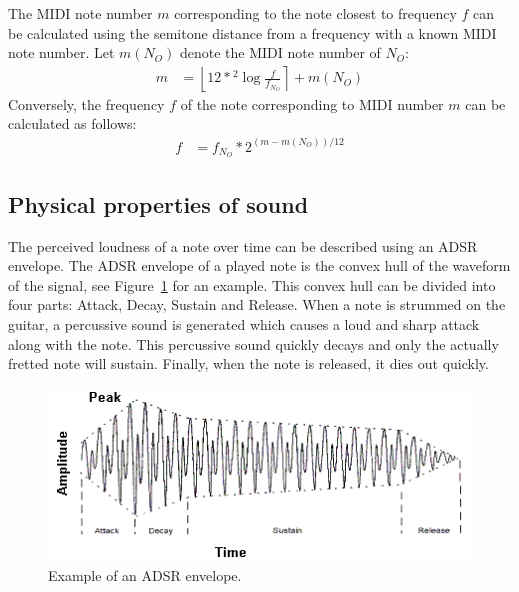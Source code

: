 \documentclass[a4paper,10pt,twocolumn]{article}
\newcommand{\round}[1]{\left \lfloor #1 \right \rceil}
\begin{document}
The MIDI note number $m$ corresponding to the note closest to frequency $f$ can be calculated using the semitone distance from a frequency with a known MIDI note number. Let $m(N_O)$ denote the MIDI note number of $N_O$:
\begin{align*}
    m &= \round{12 * {}^{2}\!\log{\frac{f}{f_{N_O}}}} + m(N_O)%
\end{align*}
Conversely, the frequency $f$ of the note corresponding to MIDI number $m$ can be calculated as follows:
\begin{align*}
    f &= f_{N_O} * 2^{(m - m(N_O)) / 12}%
\end{align*}


\subsection{Physical properties of sound}  \label{sec:physsound}
The perceived loudness of a note over time can be described using an ADSR envelope. The ADSR envelope of a played note is the convex hull of the waveform of the signal, see Figure~\ref{fig:adsr} for an example. This convex hull can be divided into four parts: Attack, Decay, Sustain and Release. When a note is strummed on the guitar, a percussive sound is generated which causes a loud and sharp attack along with the note. This percussive sound quickly decays and only the actually fretted note will sustain. Finally, when the note is released, it dies out quickly.
\begin{figure}[h]
    \centering
    \includegraphics[width=\linewidth]{fig/envelope.png}
    \caption{Example of an ADSR envelope.}
    \label{fig:adsr}
\end{figure}
\end{document}

